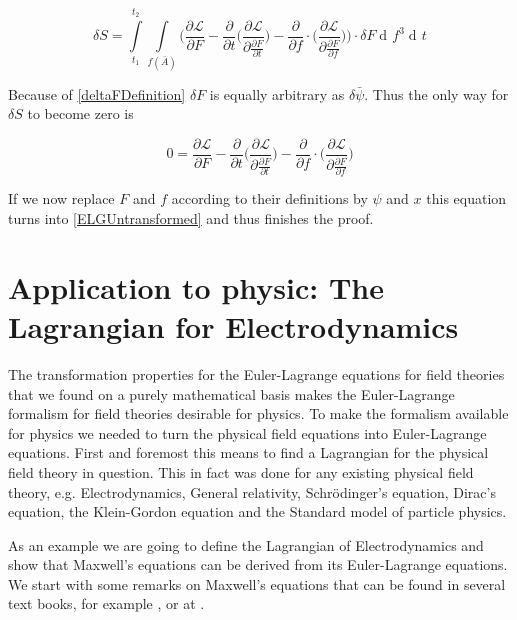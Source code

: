 \documentclass{article}
\DeclareMathOperator{\dd}{d\!}
\begin{document}
\begin{equation}
\delta S = \int\limits_{t_1}^{t_2} \int\limits_{f(\bar{A})} 
\bigg(
\frac{\partial \mathcal{L}}{\partial F}
-\frac{\partial}{\partial t} \bigg( \frac{\partial \mathcal{L}}{\partial \frac{\partial F}{\partial t}} \bigg) 
-\frac{\partial}{\partial f} \cdot \bigg( \frac{\partial \mathcal{L}}{\partial \frac{\partial F}{\partial f}} \bigg)\bigg) \cdot \delta F
\dd f^3 \dd t
\end{equation}

Because of \ref{deltaFDefinition} $\delta F$ is equally arbitrary as $\delta \bar{\psi}$. Thus the only way for $\delta S$ to become zero is

\begin{equation}
0 = 
\frac{\partial \mathcal{L}}{\partial F}
-\frac{\partial}{\partial t} \bigg( \frac{\partial \mathcal{L}}{\partial \frac{\partial F}{\partial t}} \bigg) 
-\frac{\partial}{\partial f} \cdot \bigg( \frac{\partial \mathcal{L}}{\partial \frac{\partial F}{\partial f}} \bigg)
\end{equation}

If we now replace $F$ and $f$ according to their definitions by $\psi$ and $x$ this equation turns into \ref{ELGUntransformed} and thus finishes the proof.




\section{Application to physic: The Lagrangian for Electrodynamics}
The transformation properties for the Euler-Lagrange equations for field theories that we found on a purely mathematical basis makes the Euler-Lagrange formalism for field theories desirable for physics.
To make the formalism available for physics we needed to turn the physical field equations into Euler-Lagrange equations.
First and foremost this means to find a Lagrangian for the physical field theory in question.
This in fact was done for any existing physical field theory, e.g. Electrodynamics, General relativity, Schr\"odinger's equation, Dirac's equation, the Klein-Gordon equation and the Standard model of particle physics.

As an example we are going to define the Lagrangian of Electrodynamics and show that Maxwell's equations can be derived from its Euler-Lagrange equations. We start with some remarks on Maxwell's equations that can be found in several text books, for example \cite{Jackson}, or at \cite{Stackexchange}.
\end{document}
